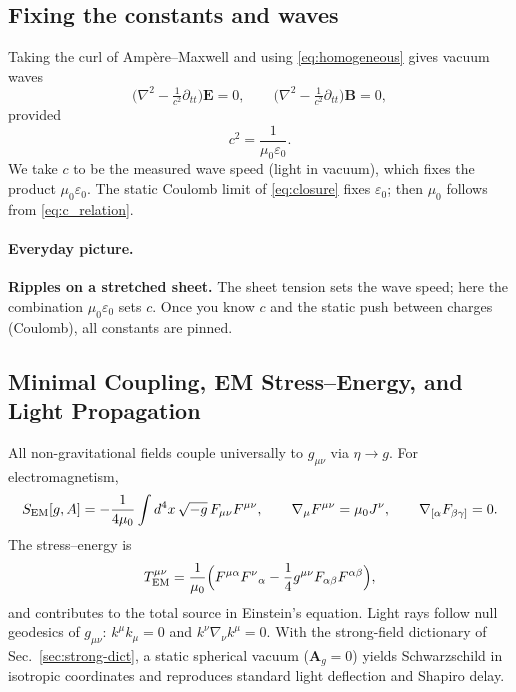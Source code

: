 \subsection{Fixing the constants and waves}
Taking the curl of Amp\`ere–Maxwell and using \eqref{eq:homogeneous} gives vacuum waves
\[
\big(\nabla^2 - \tfrac{1}{c^2}\partial_{tt}\big)\mathbf E=0,
\qquad
\big(\nabla^2 - \tfrac{1}{c^2}\partial_{tt}\big)\mathbf B=0,
\]
provided
\begin{equation}
c^2=\frac{1}{\mu_0\varepsilon_0}.
\label{eq:c_relation}
\end{equation}
We take $c$ to be the measured wave speed (light in vacuum), which fixes the product $\mu_0\varepsilon_0$. The static Coulomb limit of \eqref{eq:closure} fixes $\varepsilon_0$; then $\mu_0$ follows from \eqref{eq:c_relation}.

\paragraph{Everyday picture.} 
\textbf{Ripples on a stretched sheet.} The sheet tension sets the wave speed; here the combination $\mu_0\varepsilon_0$ sets $c$. Once you know $c$ and the static push between charges (Coulomb), all constants are pinned.

\subsection{Minimal Coupling, EM Stress--Energy, and Light Propagation}
\label{sec:EM-coupling}
All non-gravitational fields couple universally to $g_{\mu\nu}$ via $\eta\to g$.
For electromagnetism,
\begin{equation}
S_{\rm EM}[g,A]=-\frac{1}{4\mu_0}\int d^4x\,\sqrt{-g}\,F_{\mu\nu}F^{\mu\nu},\qquad
\nabla_\mu F^{\mu\nu}=\mu_0 J^\nu,\qquad \nabla_{[\alpha}F_{\beta\gamma]}=0.
\label{eq:EM-covariant}
\end{equation}
The stress--energy is
\begin{equation}
T^{\mu\nu}_{\rm EM}=\frac{1}{\mu_0}\Big(F^{\mu\alpha}F^\nu{}_\alpha-\frac{1}{4}g^{\mu\nu}F_{\alpha\beta}F^{\alpha\beta}\Big),
\label{eq:EM-Tmunu}
\end{equation}
and contributes to the total source in Einstein’s equation.
Light rays follow null geodesics of $g_{\mu\nu}$: $k^\mu k_\mu=0$ and $k^\nu\nabla_\nu k^\mu=0$.
With the strong-field dictionary of Sec.~\ref{sec:strong-dict}, a static spherical vacuum ($\mathbf A_g=0$) yields Schwarzschild in isotropic coordinates and reproduces standard light deflection and Shapiro delay.

